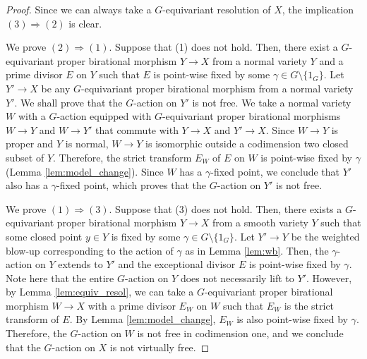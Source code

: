 \documentclass[10pt,a4paper]{amsart}
\begin{document}
\begin{proof}
Since we can always take a $G$-equivariant resolution of $X$, the implication $(3) \Rightarrow (2)$ is clear. 

We prove $(2) \Rightarrow (1)$. 
Suppose that (1) does not hold. 
Then, there exist a $G$-equivariant proper birational morphism $Y \to X$ from a normal variety $Y$ 
and a prime divisor $E$ on $Y$ such that $E$ is point-wise fixed by some $\gamma \in G \setminus \{ 1_G \}$. 
Let $Y' \to X$ be any $G$-equivariant proper birational morphism from a normal variety $Y'$. 
We shall prove that the $G$-action on $Y'$ is not free.  
We take a normal variety $W$ with a $G$-action equipped with $G$-equivariant proper birational morphisms $W \to Y$ and $W \to Y'$ that commute with $Y \to X$ and $Y' \to X$. 
Since $W \to Y$ is proper and $Y$ is normal, $W \to Y$ is isomorphic outside a codimension two closed subset of $Y$. 
Therefore, the strict transform $E_W$ of $E$ on $W$ is point-wise fixed by $\gamma$ (Lemma \ref{lem:model_change}). 
Since $W$ has a $\gamma$-fixed point, we conclude that $Y'$ also has a $\gamma$-fixed point, which proves that the $G$-action on $Y'$ is not free. 

We prove $(1) \Rightarrow (3)$.
Suppose that (3) does not hold. 
Then, there exists a $G$-equivariant proper birational morphism $Y \to X$ from a smooth variety $Y$ such that 
some closed point $y \in Y$ is fixed by some $\gamma \in G \setminus \{ 1_G \}$. 
Let $Y' \to Y$ be the weighted blow-up corresponding to the action of $\gamma$ as in Lemma \ref{lem:wb}. 
Then, the $\gamma$-action on $Y$ extends to $Y'$ and the exceptional divisor $E$ is point-wise fixed by $\gamma$. 
Note here that the entire $G$-action on $Y$ does not necessarily lift to $Y'$. 
However, by Lemma \ref{lem:equiv_resol}, we can take a $G$-equivariant proper birational morphism $W \to X$ with a prime divisor $E_W$ on $W$ such that $E_W$ is the strict transform of $E$. 
By Lemma \ref{lem:model_change}, $E_W$ is also point-wise fixed by $\gamma$. 
Therefore, the $G$-action on $W$ is not free in codimension one, 
and we conclude that the $G$-action on $X$ is not virtually free. 
\end{proof}
\end{document}
